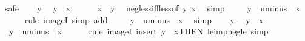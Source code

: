 \begin{isabellebody}
%
\isadelimproof
%
\endisadelimproof
%
\isatagproof
{}\isamarkupfalse%
\ safe\isanewline
\ \ \isamarkupfalse%
\ y\ \isamarkupfalse%
\ {\isachardoublequoteopen}y\ {\isacharless}{\kern0pt}\ {\isacharminus}{\kern0pt}x{\isachardoublequoteclose}\isanewline
\ \ \isamarkupfalse%
\ {\isacharasterisk}{\kern0pt}{\isacharcolon}{\kern0pt}\ \ {\isachardoublequoteopen}x\ {\isacharless}{\kern0pt}\ {\isacharminus}{\kern0pt}y{\isachardoublequoteclose}\ \isamarkupfalse%
\ neg{\isacharunderscore}{\kern0pt}less{\isacharunderscore}{\kern0pt}iff{\isacharunderscore}{\kern0pt}less{\isacharbrackleft}{\kern0pt}of\ {\isachardoublequoteopen}{\isacharminus}{\kern0pt}y{\isachardoublequoteclose}\ x{\isacharbrackright}{\kern0pt}\ \isamarkupfalse%
\ simp\isanewline
\ \ \isamarkupfalse%
\ {\isachardoublequoteopen}{\isacharminus}{\kern0pt}\ {\isacharparenleft}{\kern0pt}{\isacharminus}{\kern0pt}y{\isacharparenright}{\kern0pt}\ {\isasymin}\ uminus\ {\isacharbackquote}{\kern0pt}\ {\isacharbraceleft}{\kern0pt}x{\isacharless}{\kern0pt}{\isachardot}{\kern0pt}{\isachardot}{\kern0pt}{\isacharbraceright}{\kern0pt}{\isachardoublequoteclose}\isanewline
\ \ \ \ \isamarkupfalse%
\ {\isacharparenleft}{\kern0pt}rule\ imageI{\isacharparenright}{\kern0pt}\ {\isacharparenleft}{\kern0pt}simp\ add{\isacharcolon}{\kern0pt}\ {\isacharasterisk}{\kern0pt}{\isacharparenright}{\kern0pt}\isanewline
\ \ \isamarkupfalse%
\ {\isachardoublequoteopen}y\ {\isasymin}\ uminus\ {\isacharbackquote}{\kern0pt}\ {\isacharbraceleft}{\kern0pt}x{\isacharless}{\kern0pt}{\isachardot}{\kern0pt}{\isachardot}{\kern0pt}{\isacharbraceright}{\kern0pt}{\isachardoublequoteclose}\ \isamarkupfalse%
\ simp\isanewline
{}\isamarkupfalse%
\isanewline
\ \ \isamarkupfalse%
\ y\ \isamarkupfalse%
\ {\isachardoublequoteopen}y\ {\isasymle}\ {\isacharminus}{\kern0pt}x{\isachardoublequoteclose}\isanewline
\ \ \isamarkupfalse%
\ {\isachardoublequoteopen}{\isacharminus}{\kern0pt}\ {\isacharparenleft}{\kern0pt}{\isacharminus}{\kern0pt}y{\isacharparenright}{\kern0pt}\ {\isasymin}\ uminus\ {\isacharbackquote}{\kern0pt}\ {\isacharbraceleft}{\kern0pt}x{\isachardot}{\kern0pt}{\isachardot}{\kern0pt}{\isacharbraceright}{\kern0pt}{\isachardoublequoteclose}\isanewline
\ \ \ \ \isamarkupfalse%
\ {\isacharparenleft}{\kern0pt}rule\ imageI{\isacharparenright}{\kern0pt}\ {\isacharparenleft}{\kern0pt}insert\ {\isacartoucheopen}y\ {\isasymle}\ {\isacharminus}{\kern0pt}x{\isacartoucheclose}{\isacharbrackleft}{\kern0pt}THEN\ le{\isacharunderscore}{\kern0pt}imp{\isacharunderscore}{\kern0pt}neg{\isacharunderscore}{\kern0pt}le{\isacharbrackright}{\kern0pt}{\isacharcomma}{\kern0pt}\ simp{\isacharparenright}{\kern0pt}\isanewline

\end{isabellebody}
